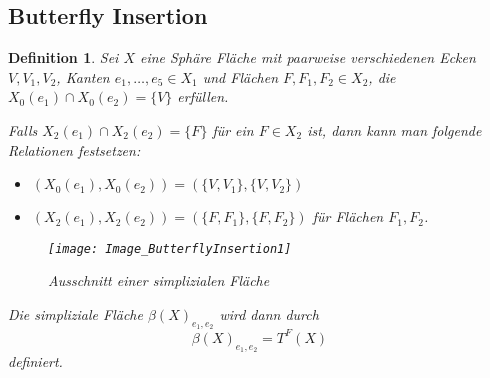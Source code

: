 \documentclass[12pt,titlepage,twoside,cleardoublepage]{article}
\theoremstyle{nummermitklammern}
\newtheorem{definition}[temp]{Definition}
\newtheorem{definition}[zahl]{Definition}
\numberwithin{equation}{section}
\begin{document}
 \subsection{Butterfly Insertion }
 \begin{definition}
 Sei $X$ eine Sphäre Fläche mit paarweise verschiedenen Ecken $V,V_1,V_2$, Kanten  $e_1,\ldots, e_5\in X_1$ und Flächen $F,F_1,F_2\in X_2$, die $ X_0(e_1)\cap X_0(e_2) =\{V\}$ erfüllen. 
 
 Falls $X_2(e_1)\cap X_2(e_2)=\{F\}$ für ein $F\in X_2$ ist, dann kann man folgende Relationen festsetzen: 
\begin{itemize}
\item $(X_0(e_1),X_0(e_2))=(\{V,V_1\},\{V,V_2\})$
\item $(X_2(e_1),X_2(e_2))=(\{F,F_1\},\{F,F_2\})$ für Flächen $F_1,F_2$.
\end{itemize}
\begin{figure}[H]
\begin{center}
\texttt{[image: Image\_ButterflyInsertion1]}
\end{center}
\caption{Ausschnitt einer simplizialen Fläche}
\end{figure}
Die simpliziale Fläche $\beta(X)_{e_1,e_2}$ wird dann durch
\[
\beta(X)_{e_1,e_2}= T^F(X)
\]
definiert.
\begin{comment}
Man erhält das ordinale Symbol der simplizialen Fläche $\beta(x)_{e_1,e_2}$ nun, indem eine neue Ecke $V'$, neue Kanten $e,e_1',e_2'$ und  Flächen $F',F''$ eingeführt werden und beim ordinale Symbol $\mu((X,<))$
 \begin{itemize}
\item die Eckenanzahl wird um 1, die Flächenanzahl um $2$ und die Kantenanzahl um $3$ erhöht, 
\item an der Stelle $F$ in $X_1(F)$ die Kante $e_1$ durch $e_1'$ und die Kante $e_2$ durch $e_2'$ ersetzt,
 \item an jeder Stelle $\bar{e}$, in der $V$ in $X_0(\bar{e})$ vorkommt, $V$ durch $V'$ ersetzt,  

\end{comment}
\end{definition}
\end{document}
